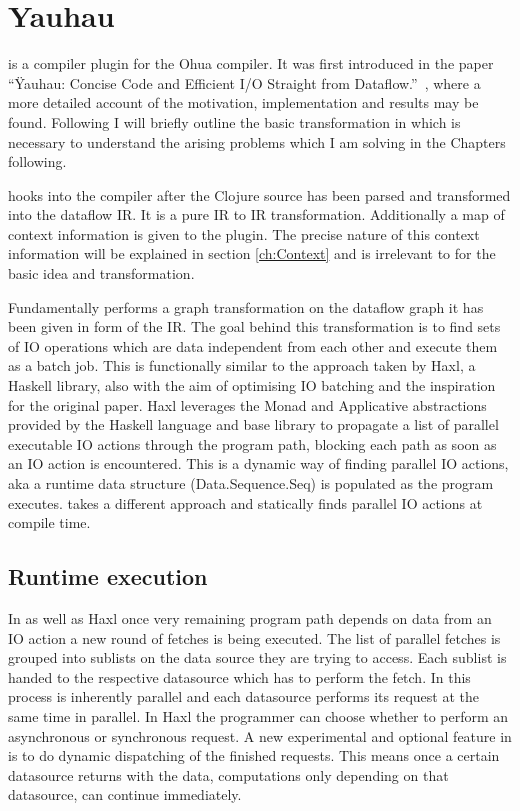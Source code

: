 \chapter{Yauhau}

\label{ch:Yauhau}

\yauhau{} is a compiler plugin for the Ohua compiler.
It was first introduced in the paper ``Ÿauhau: Concise Code and Efficient I/O Straight from Dataflow.''~\cite{ErtelGoensAdamEtAl2016}, where a more detailed account of the motivation, implementation and results may be found.
Following I will briefly outline the basic transformation in \yauhau{} which is necessary to understand the arising problems which I am solving in the Chapters following.

\yauhau{} hooks into the compiler after the Clojure source has been parsed and transformed into the dataflow IR.
It is a pure IR to IR transformation.
Additionally a map of context information is given to the plugin.
The precise nature of this context information will be explained in section \ref{ch:Context} and is irrelevant to for the basic \yauhau{} idea and transformation.

Fundamentally \yauhau{} performs a graph transformation on the dataflow graph it has been given in form of the IR.
The goal behind this transformation is to find sets of IO operations which are data independent from each other and execute them as a batch job.
This is functionally similar to the approach taken by Haxl\cite{Haxl:library:link}, a Haskell library, also with the aim of optimising IO batching and the inspiration for the original paper.
Haxl leverages the Monad and Applicative abstractions provided by the Haskell language and base library to propagate a list of parallel executable IO actions through the program path, blocking each path as soon as an IO action is encountered.
This is a dynamic way of finding parallel IO actions, aka a runtime data structure (Data.Sequence.Seq) is populated as the program executes.
\yauhau{} takes a different approach and statically finds parallel IO actions at compile time.

\section{Runtime execution}

In \yauhau{} as well as Haxl once very remaining program path depends on data from an IO action a new round of fetches is being executed.
The list of parallel fetches is grouped into sublists on the data source they are trying to access.
Each sublist is handed to the respective datasource which has to perform the fetch.
In \yauhau{} this process is inherently parallel and each datasource performs its request at the same time in parallel.
In Haxl the programmer can choose whether to perform an asynchronous or synchronous request.
A new experimental and optional feature in \yauhau{} is to do dynamic dispatching of the finished requests.
This means once a certain datasource returns with the data, computations only depending on that datasource, can continue immediately.

